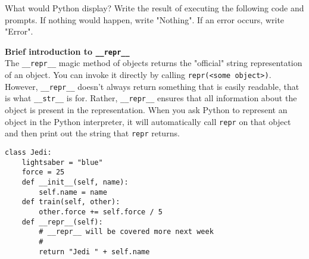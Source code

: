 \begin{blocksection}
\question What would Python display? Write the result of executing the following code and prompts. If nothing would happen, write "Nothing". If an error occurs, write "Error".

\textbf{Brief introduction to \lstinline{__repr__}} \\ The \lstinline{__repr__} magic method of objects returns the "official" string representation of an object. You can invoke it directly by calling \lstinline{repr(<some object>)}. However, \lstinline{__repr__} doesn't always return something that is easily readable, that is what \lstinline{__str__} is for. Rather, \lstinline{__repr__} ensures that all information about the object is present in the representation. When you ask Python to represent an object in the Python interpreter, it will automatically call \lstinline{repr} on that object and then print out the string that \lstinline{repr} returns.

\vspace{1.5\baselineskip}

\begin{lstlisting}
class Jedi:
    lightsaber = "blue"
    force = 25
    def __init__(self, name):
        self.name = name
    def train(self, other):
        other.force += self.force / 5
    def __repr__(self):
        # __repr__ will be covered more next week
        # 
        return "Jedi " + self.name
\end{lstlisting}
\end{blocksection}

